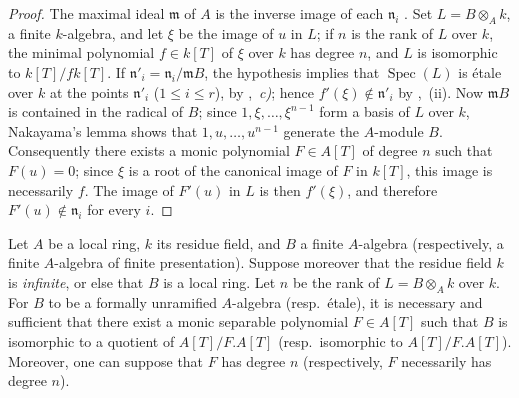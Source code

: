 \begin{proof}
The maximal ideal $\mathfrak{m}$ of $A$ is the inverse image of each $\mathfrak{n}_i$ .
Set $L=B\otimes_A k$, a finite $k$-algebra, and let $\xi$ be the image of $u$ in $L$; if $n$ is the rank of $L$ over $k$, the minimal polynomial $f\in k[T]$ of $\xi$ over $k$ has degree $n$, and $L$ is isomorphic to $k[T]/f k[T]$.
If $\mathfrak{n}'_i=\mathfrak{n}_i/\mathfrak{m}B$, the hypothesis implies that $\operatorname{Spec}(L)$ is \'etale over $k$ at the points $\mathfrak{n}'_i$ ($1\leq i\leq r$), by ,~\emph{c)}; hence $f'(\xi)\notin\mathfrak{n}'_i$ by ,~(ii).
Now $\mathfrak{m}B$ is contained in the radical of $B$; since $1,\xi,\ldots,\xi^{n-1}$ form a basis of $L$ over $k$, Nakayama's lemma shows that $1,u,\ldots,u^{n-1}$ generate the $A$-module $B$.
Consequently there exists a monic polynomial $F\in A[T]$ of degree $n$ such that $F(u)=0$; since $\xi$ is a root of the canonical image of $F$ in $k[T]$, this image is necessarily $f$.
The image of $F'(u)$ in $L$ is then $f'(\xi)$, and therefore $F'(u)\notin\mathfrak{n}_i$ for every $i$.
\end{proof}

\begin{proposition}[18.4.5]
\label{IV.18.4.5}
Let $A$ be a local ring, $k$ its residue field, and $B$ a finite $A$-algebra \textup{(respectively,} a finite $A$-algebra of finite presentation\textup{)}.
Suppose moreover that the residue field $k$ is \emph{infinite}, or else that $B$ is a local ring.
Let $n$ be the rank of $L=B\otimes_A k$ over $k$.
For $B$ to be a formally unramified $A$-algebra \textup{(resp.}\ \'etale\textup{)}, it is necessary and sufficient that there exist a monic separable polynomial $F\in A[T]$ such that $B$ is isomorphic to a quotient of $A[T]/F.A[T]$ \textup{(resp.}\ isomorphic to $A[T]/F.A[T]$\textup{)}.
Moreover, one can suppose that $F$ has degree $n$ \textup{(respectively,} $F$ necessarily has degree $n$\textup{)}.
\end{proposition}


